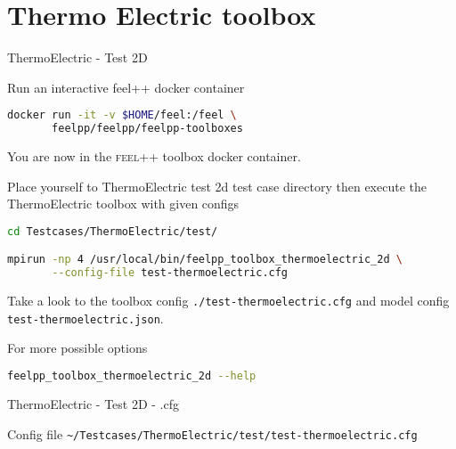 \section[ThermoElectric]{Thermo Electric toolbox}


\begin{frame}{ThermoElectric - Test 2D}

Run an interactive feel++ docker container

\begin{lstlisting}[language=Bash,mathescape=false,emph={docker}]
docker run -it -v $HOME/feel:/feel \
       feelpp/feelpp/feelpp-toolboxes 
\end{lstlisting}

You are now in the \textsc{feel++} toolbox docker container.

Place yourself to ThermoElectric test 2d test case directory then execute the
ThermoElectric toolbox with given configs

\begin{lstlisting}[language=Bash,mathescape=false, emph={feelpp_toolbox_thermoelectric_2d}]
cd Testcases/ThermoElectric/test/

mpirun -np 4 /usr/local/bin/feelpp_toolbox_thermoelectric_2d \
       --config-file test-thermoelectric.cfg
\end{lstlisting}

Take a look to the toolbox config \lstinline{./test-thermoelectric.cfg} and model config
\lstinline{test-thermoelectric.json}.

For more possible options
\begin{lstlisting}[language=Bash,mathescape=false, emph={feelpp_toolbox_thermoelectric_2d}]
feelpp_toolbox_thermoelectric_2d --help
\end{lstlisting}

\end{frame}


\begin{frame}{ThermoElectric - Test 2D - .cfg}

Config file \lstinline{~/Testcases/ThermoElectric/test/test-thermoelectric.cfg}

\vspace{5mm}


\end{frame}


